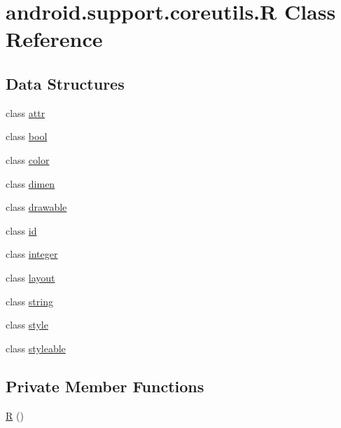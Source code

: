 \hypertarget{classandroid_1_1support_1_1coreutils_1_1_r}{}\section{android.\+support.\+coreutils.\+R Class Reference}
\label{classandroid_1_1support_1_1coreutils_1_1_r}
\subsection*{Data Structures}
\begin{DoxyCompactItemize}
\item 
class \mbox{\hyperlink{classandroid_1_1support_1_1coreutils_1_1_r_1_1attr}{attr}}
\item 
class \mbox{\hyperlink{classandroid_1_1support_1_1coreutils_1_1_r_1_1bool}{bool}}
\item 
class \mbox{\hyperlink{classandroid_1_1support_1_1coreutils_1_1_r_1_1color}{color}}
\item 
class \mbox{\hyperlink{classandroid_1_1support_1_1coreutils_1_1_r_1_1dimen}{dimen}}
\item 
class \mbox{\hyperlink{classandroid_1_1support_1_1coreutils_1_1_r_1_1drawable}{drawable}}
\item 
class \mbox{\hyperlink{classandroid_1_1support_1_1coreutils_1_1_r_1_1id}{id}}
\item 
class \mbox{\hyperlink{classandroid_1_1support_1_1coreutils_1_1_r_1_1integer}{integer}}
\item 
class \mbox{\hyperlink{classandroid_1_1support_1_1coreutils_1_1_r_1_1layout}{layout}}
\item 
class \mbox{\hyperlink{classandroid_1_1support_1_1coreutils_1_1_r_1_1string}{string}}
\item 
class \mbox{\hyperlink{classandroid_1_1support_1_1coreutils_1_1_r_1_1style}{style}}
\item 
class \mbox{\hyperlink{classandroid_1_1support_1_1coreutils_1_1_r_1_1styleable}{styleable}}
\end{DoxyCompactItemize}
\subsection*{Private Member Functions}
\begin{DoxyCompactItemize}
\item 
\mbox{\hyperlink{classandroid_1_1support_1_1coreutils_1_1_r_a8b937fa0ffc3844f88768f1241763f97}{R}} ()
\end{DoxyCompactItemize}


